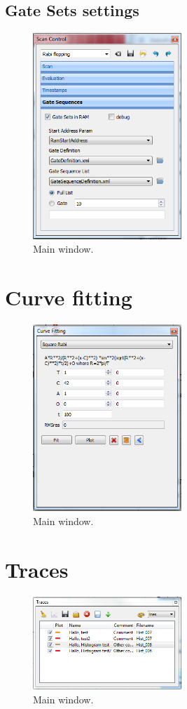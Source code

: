 \documentclass[11pt]{scrartcl}
\begin{document}
\subsection{Gate Sets settings}
\begin{figure}[htbp]
\begin{center}
\includegraphics[width=0.5\textwidth]{ScanParametersGateSequences}
\end{center}
\caption{\label{PulseProgram} Main window.}
\end{figure}

\section{Curve fitting}
\begin{figure}[htbp]
\begin{center}
\includegraphics[width=0.5\textwidth]{CurveFitting}
\end{center}
\caption{\label{AutoloadSettings} Main window.}
\end{figure}

\section{Traces}
\begin{figure}[htbp]
\begin{center}
\includegraphics[width=0.5\textwidth]{Traces}
\end{center}
\caption{\label{AutoloadSettings} Main window.}
\end{figure}
\end{document}
